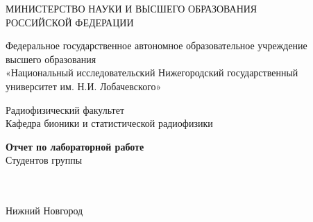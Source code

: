 \begin{titlepage}
	\centering

	МИНИСТЕРСТВО НАУКИ И ВЫСШЕГО ОБРАЗОВАНИЯ \\
	РОССИЙСКОЙ ФЕДЕРАЦИИ

	\vspace{1em}
	Федеральное государственное автономное образовательное учреждение \\
	высшего образования \\
	«Национальный исследовательский Нижегородский государственный \\
	университет им. Н.И. Лобачевского»

	\vspace{1em}
	Радиофизический факультет \\
	Кафедра бионики и статистической радиофизики

	\vfill
	\begin{minipage}{0.8\linewidth}
		\centering\large\bfseries\MakeUppercase{\labtheme}
	\end{minipage}

	\vfill
	\begin{flushright}
		\begin{minipage}{0.48\textwidth}
			\raggedright
			{\bfseries Отчет по лабораторной работе}\\
			Студентов группы \labgroupshort \\
			\course \\
			\labauthors \\
			\vspace{1em}
			\studyprogram
		\end{minipage}
	\end{flushright}

	\vfill
	Нижний Новгород \the\year{}
\end{titlepage}

\newpage
\thispagestyle{empty}
\null
\newpage
\setcounter{page}{1} 